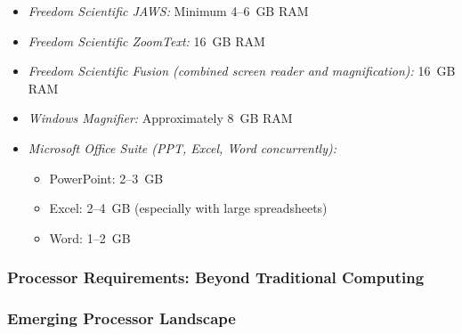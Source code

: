 \begin{itemize}
	\item \emph{Freedom Scientific JAWS:} Minimum 4--6~GB RAM \supercite{FreedomScientificJAWSRequirements}
	\item \emph{Freedom Scientific ZoomText:} 16~GB RAM \supercite{FreedomScientificZoomTextRequirements}
	\item \emph{Freedom Scientific Fusion (combined screen reader and magnification):} 16~GB RAM \supercite{FreedomScientificFusionRequirements}
	\item \emph{Windows Magnifier:} Approximately 8~GB RAM \supercite{MicrosoftWindowsAccessibility}
	\item \emph{Microsoft Office Suite (PPT, Excel, Word concurrently):} \supercite{MicrosoftOfficeSystemRequirements}

	      \begin{itemize}
		      \item PowerPoint: 2--3~GB
		      \item Excel: 2--4~GB (especially with large spreadsheets)
		      \item Word: 1--2~GB
	      \end{itemize}

\end{itemize}

\subsubsection{Processor Requirements: Beyond Traditional Computing}

\subsubsection{Emerging Processor Landscape}

